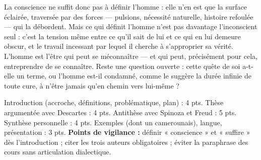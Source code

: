 \documentclass[11pt]{article}
\begin{document}
\begin{corrige}
La conscience ne suffit donc pas à définir l'homme : elle n'en est que la surface éclairée, traversée par des forces — pulsions, nécessité naturelle, histoire refoulée — qui la débordent. Mais ce qui définit l'homme n'est pas davantage l'inconscient seul : c'est la tension même entre ce qu'il sait de lui et ce qui en lui demeure obscur, et le travail incessant par lequel il cherche à s'approprier sa vérité. L'homme est l'être qui peut se méconnaître — et qui peut, précisément pour cela, entreprendre de se connaître. Reste une question ouverte : cette quête de soi a-t-elle un terme, ou l'homme est-il condamné, comme le suggère la durée infinie de toute cure, à n'être jamais qu'en chemin vers lui-même ?
\end{corrige}

\begin{attention}
Introduction (accroche, définitions, problématique, plan) : 4 pts. Thèse argumentée avec Descartes : 4 pts. Antithèse avec Spinoza et Freud : 5 pts. Synthèse personnelle : 4 pts. Exemples (dont un camerounais), langue, présentation : 3 pts. \textbf{Points de vigilance :} définir « conscience » et « suffire » dès l'introduction ; citer les trois auteurs obligatoires ; éviter la paraphrase des cours sans articulation dialectique.
\end{attention}
\end{document}
